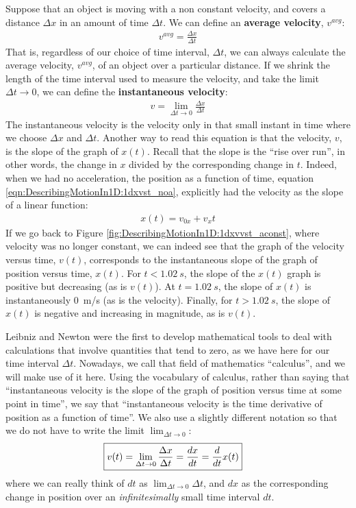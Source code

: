 Suppose that an object is moving with a non constant velocity, and covers a distance $\Delta x$ in an amount of time $\Delta t$. We can define an \textbf{average velocity}, $v^{avg}$:
\begin{align*}
v^{avg}= \frac{\Delta x}{\Delta t}
\end{align*}
That is, regardless of our choice of time interval, $\Delta t$, we can always calculate the average velocity, $v^{avg}$, of an object over a particular distance. If we shrink the length of the time interval used to measure the velocity, and take the limit $\Delta t\to 0$, we can define the \textbf{instantaneous velocity}:
\begin{align*}
v = \lim_{\Delta t\to 0} \frac{\Delta x}{\Delta t}
\end{align*}
The instantaneous velocity is the velocity only in that small instant in time where we choose $\Delta x$ and $\Delta t$. Another way to read this equation is that the velocity, $v$, is the slope of the graph of $x(t)$. Recall that the slope is the ``rise over run'', in other words, the change in $x$ divided by the corresponding change in $t$. Indeed, when we had no acceleration, the position as a function of time, equation \ref{eqn:DescribingMotionIn1D:1dxvst_noa}, explicitly had the velocity as the slope of a linear function:
 \begin{align*}
 x(t) = v_{0x}+v_xt
 \end{align*}
 If we go back to Figure \ref{fig:DescribingMotionIn1D:1dxvvst_aconst}, where velocity was no longer constant, we can indeed see that the graph of the velocity versus time, $v(t)$, corresponds to the instantaneous slope of the graph of position versus time, $x(t)$. For $t<\SI{1.02}{s}$, the slope of the $x(t)$ graph is positive but decreasing (as is $v(t)$). At $t=\SI{1.02}{s}$, the slope of $x(t)$ is instantaneously \SI{0}{m/s} (as is the velocity). Finally, for $t>\SI{1.02}{s}$, the slope of $x(t)$ is negative and increasing in magnitude, as is $v(t)$.

Leibniz and Newton were the first to develop mathematical tools to deal with calculations that involve quantities that tend to zero, as we have here for our time interval $\Delta t$. Nowadays, we call that field of mathematics ``calculus'', and we will make use of it here. Using the vocabulary of calculus, rather than saying that ``instantaneous velocity is the slope of the graph of position versus time at some point in time'', we say that ``instantaneous velocity is the time derivative of position as a function of time''. We also use a slightly different notation so that we do not have to write the limit $\lim_{\Delta t\to 0}$:
\begin{align}
\label{eqn:DescribingMotionIn1D:vdef}
\Aboxed{v(t)=\lim_{\Delta t\to 0} \frac{\Delta x}{\Delta t}=\frac{dx}{dt}=\frac{d}{dt} x(t)}
\end{align}
where we can really think of $dt$ as $\lim_{\Delta t\to 0}\Delta t$, and $dx$ as the corresponding change in position over an \textit{infinitesimally} small time interval $dt$.

